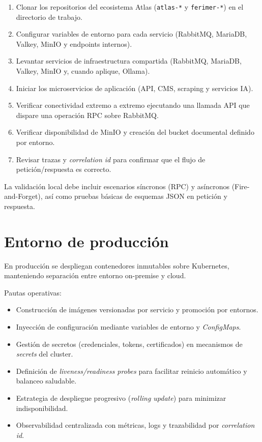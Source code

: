 \begin{enumerate}
\item Clonar los repositorios del ecosistema Atlas (\texttt{atlas-*} y \texttt{ferimer-*}) en el directorio de trabajo.
\item Configurar variables de entorno para cada servicio (RabbitMQ, MariaDB, Valkey, MinIO y endpoints internos).
\item Levantar servicios de infraestructura compartida (RabbitMQ, MariaDB, Valkey, MinIO y, cuando aplique, Ollama).
\item Iniciar los microservicios de aplicación (API, CMS, scraping y servicios IA).
\item Verificar conectividad extremo a extremo ejecutando una llamada API que dispare una operación RPC sobre RabbitMQ.
\item Verificar disponibilidad de MinIO y creación del bucket documental definido por entorno.
\item Revisar trazas y \textit{correlation id} para confirmar que el flujo de petición/respuesta es correcto.
\end{enumerate}

La validación local debe incluir escenarios síncronos (RPC) y asíncronos (Fire-and-Forget), así como pruebas básicas de esquemas JSON en petición y respuesta.

\section{Entorno de producción}

En producción se despliegan contenedores inmutables sobre Kubernetes, manteniendo separación entre entorno on-premise y cloud.

Pautas operativas:

\begin{itemize}
\item Construcción de imágenes versionadas por servicio y promoción por entornos.
\item Inyección de configuración mediante variables de entorno y \textit{ConfigMaps}.
\item Gestión de secretos (credenciales, tokens, certificados) en mecanismos de \textit{secrets} del cluster.
\item Definición de \textit{liveness/readiness probes} para facilitar reinicio automático y balanceo saludable.
\item Estrategia de despliegue progresivo (\textit{rolling update}) para minimizar indisponibilidad.
\item Observabilidad centralizada con métricas, logs y trazabilidad por \textit{correlation id}.
\end{itemize}

